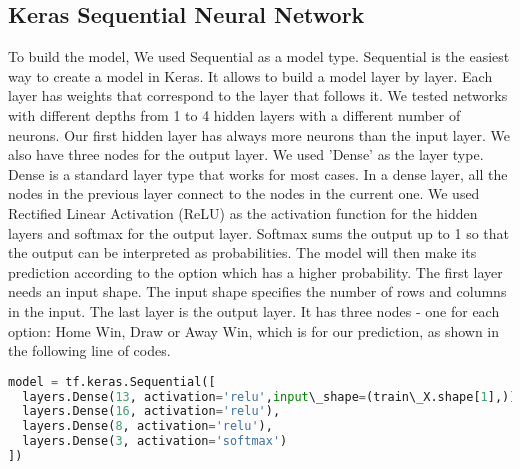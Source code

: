 \subsection{Keras Sequential Neural Network}

To build the model, We used Sequential as a model type. Sequential is the easiest way to create a model in Keras. It allows to build a model layer by layer. Each layer has weights that correspond to the layer that follows it. \newline \newline %
We tested networks with different depths from 1 to 4 hidden layers with a different number of neurons. Our first hidden layer has always more neurons than the input layer. We also have three nodes for the output layer.\newline \newline
We used 'Dense' as the layer type. Dense is a standard layer type that works for most cases. In a dense layer, all the nodes in the previous layer connect to the nodes in the current one.\newline \newline
We used Rectified Linear Activation (ReLU) as the activation function for the hidden layers and softmax for the output layer. Softmax sums the output up to 1 so that the output can be interpreted as probabilities. The model will then make its prediction according to the option which has a higher probability.\newline \newline
The first layer needs an input shape. The input shape specifies the number of rows and columns in the input.\newline
The last layer is the output layer. It has three nodes - one for each option: Home Win, Draw or Away Win, which is for our prediction, as shown in the following line of codes.\newline \newline \newline \newline \newline
\begin{lstlisting}[language=Python, caption=Python code for simple Keras Sequantial Model Instantiation]
model = tf.keras.Sequential([ 
  layers.Dense(13, activation='relu',input\_shape=(train\_X.shape[1],)), 
  layers.Dense(16, activation='relu'),
  layers.Dense(8, activation='relu'),
  layers.Dense(3, activation='softmax')
])
\end{lstlisting}
